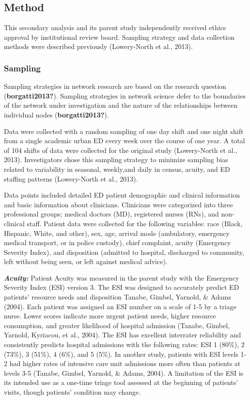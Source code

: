 \documentclass[
]{article}
\begin{document}
\hypertarget{method-1}{%
\subsection{Method}\label{method-1}}

This secondary analysis and its parent study independently received
ethics approval by institutional review board. Sampling strategy and
data collection methods were described previously (Lowery-North et al.,
2013).

\hypertarget{sampling}{%
\subsubsection{Sampling}\label{sampling}}

Sampling strategies in network research are based on the research
question (\textbf{borgatti2013?}). Sampling strategies in network
science defer to the boundaries of the network under investigation and
the nature of the relationships between individual nodes
(\textbf{borgatti2013?}).

Data were collected with a random sampling of one day shift and one
night shift from a single academic urban ED every week over the course
of one year. A total of 104 shifts of data were collected for the
original study (Lowery-North et al., 2013). Investigators chose this
sampling strategy to minimize sampling bias related to variability in
seasonal, weekly,and daily in census, acuity, and ED staffing patterns
(Lowery-North et al., 2013).

Data points included detailed ED patient demographic and clinical
information and basic information about clinicians. Clinicians were
categorized into three professional groups; medical doctors (MD),
registered nurses (RNs), and non-clinical staff. Patient data were
collected for the following variables: race (Black, Hispanic, White, and
other), sex, age, arrival mode (ambulatory, emergency medical transport,
or in police custody), chief complaint, acuity (Emergency Severity
Index), and disposition (admitted to hospital, discharged to community,
left without being seen, or left against medical advice).

\textbf{\emph{Acuity:}} Patient Acuity was measured in the parent study
with the Emergency Severity Index (ESI) version 3. The ESI was designed
to accurately predict ED patients' resource needs and disposition
Tanabe, Gimbel, Yarnold, \& Adams (2004). Each patient was assigned an
ESI number on a scale of 1-5 by a triage nurse. Lower scores indicate
more urgent patient needs, higher resource consumption, and greater
likelihood of hospital admission (Tanabe, Gimbel, Yarnold, Kyriacou, et
al., 2004). The ESI has excellent interrater reliability and
consistently predicts hospital admissions with the following rates: ESI
1 (80\%), 2 (73\%), 3 (51\%), 4 (6\%), and 5 (5\%). In another study,
patients with ESI levels 1-2 had higher rates of intensive care unit
admissions more often than patients at levels 3-5 (Tanabe, Gimbel,
Yarnold, \& Adams, 2004). A limitation of the ESI is its intended use as
a one-time triage tool assessed at the beginning of patients' visits,
though patients' condition may change.
\end{document}
